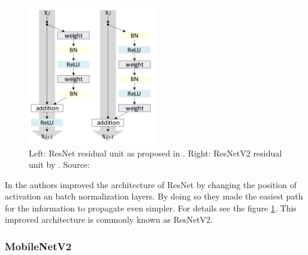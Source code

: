 \begin{figure}
    \centering
    \includegraphics[width=0.5\textwidth]{img/resnetv2.png}
    \caption{Left: ResNet residual unit as proposed in \citep{resnet}. Right: ResNetV2 residual unit by \citep{resnetv2}. Source: \cite{resnetv2}}
    \label{fig:resnetv2}
\end{figure}

In \citep{resnetv2}  the authors improved the architecture of ResNet by changing the position of activation an batch normalization layers. By doing so they made the easiest path for the information to propagate even simpler. For details see the figure \ref{fig:resnetv2}. This improved architecture is commonly known as ResNetV2.




\subsubsection*{MobileNetV2}


